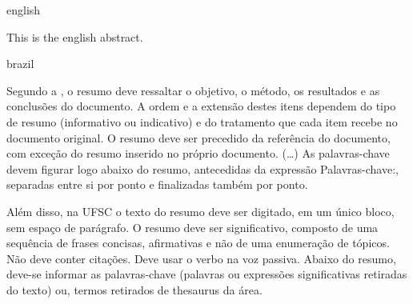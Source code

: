 \swapcontents
{
    \begin{otherlanguage*}{english}
    \begin{resumo}[Abstract]

        This is the english abstract.


    \end{resumo}
    \end{otherlanguage*}
}
{
    \begin{otherlanguage*}{brazil}
    \begin{resumo}[Resumo]

        Segundo a \textcite[3.1-3.2]{NBR6028:2003}, o resumo deve ressaltar o
        objetivo, o método, os resultados e as conclusões do documento. A ordem e a extensão
        destes itens dependem do tipo de resumo (informativo ou indicativo) e do
        tratamento que cada item recebe no documento original. O resumo deve ser
        precedido da referência do documento, com exceção do resumo inserido no
        próprio documento. (\ldots) As palavras-chave devem figurar logo abaixo do
        resumo, antecedidas da expressão Palavras-chave:, separadas entre si por
        ponto e finalizadas também por ponto.

        Além disso, na UFSC o texto do resumo deve ser digitado, em um único bloco, sem espaço de parágrafo. O resumo deve
        ser significativo, composto de uma sequência de frases concisas, afirmativas e não de uma
        enumeração de tópicos. Não deve conter citações. Deve usar o verbo na voz passiva. Abaixo do
        resumo, deve-se informar as palavras-chave (palavras ou expressões significativas retiradas do
        texto) ou, termos retirados de thesaurus da área. 


    \end{resumo}
    \end{otherlanguage*}
}



